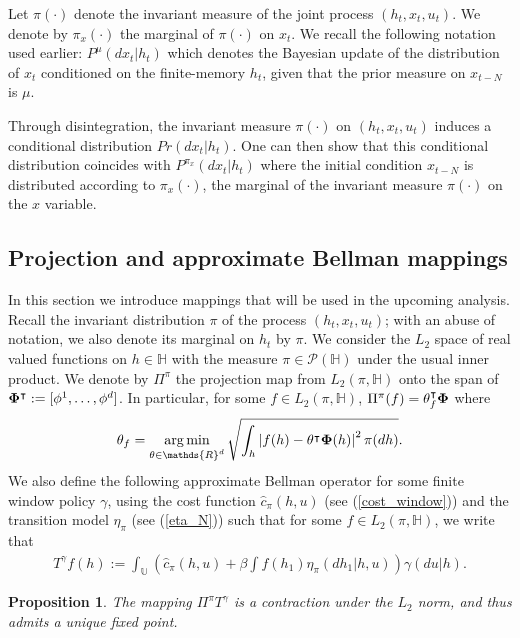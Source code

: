 \documentclass[letterpaper, 10 pt, conference]{ieeeconf}  %
\def\argmin{\mathop{\rm arg\, min}}
\def\P{{\mathcal P}}
\newtheorem{prop}{Proposition}
\theoremstyle{definition}
\theoremstyle{remark}
\begin{document}
Let $\pi(\cdot)$ denote the invariant measure of the joint process $(h_t,x_{t},u_t)$.  We denote by $\pi_x(\cdot)$ the marginal of $\pi(\cdot)$ on $x_t$. We recall the following notation used earlier:
$
P^\mu(dx_t|h_t)
$
which denotes the Bayesian update of the distribution of $x_t$ conditioned on the finite-memory $h_t$, given that the prior measure on  $x_{t-N}$ is $\mu$. 

Through disintegration, the invariant measure $\pi(\cdot)$ on $(h_t,x_{t},u_t)$ induces a conditional distribution $Pr(dx_t|h_t)$. 
One can then show that this conditional distribution coincides with $P^{\pi_x}(dx_t|h_t)$ where the initial condition $x_{t-N}$ is distributed according to $\pi_x(\cdot)$, the marginal of the invariant measure $\pi(\cdot)$ on the $x$ variable.

\subsection{Projection and approximate Bellman mappings} In this section we introduce mappings that will be used in the upcoming analysis. Recall the invariant distribution $\pi$ of the process $(h_t,x_t,u_t)$; with an abuse of notation, we also denote its marginal on $h_t$ by $\pi$. We consider the $L_2$ space of real valued functions on $h\in \mathds{H}$ with the measure $\pi\in \P(\mathds{H})$ under the usual inner product. We denote by $\Pi^\pi$ the projection map from $ L_2(\pi,\mathds{H})$ onto the span of ${\bf \Phi}^\intercal:= [\phi^1,\dots,\phi^d]$. In particular, for some $f\in  L_2(\pi,\mathds{H})$, $\Pi^\pi(f) = \theta_f^\intercal {\bf \Phi} $ where 
\begin{align}\label{proj}
\theta_f =\argmin_{\theta\in\mathds{R}^d} \sqrt{\int_h \left| f(h) - \theta^\intercal {\bf \Phi}(h)\right|^2 \pi(dh)}.
\end{align}
We also define the following approximate Bellman operator for some finite window policy $\gamma$, using the cost function $\hat{c}_\pi(h,u)$ (see (\ref{cost_window})) and the transition model $\eta_\pi$ (see (\ref{eta_N})) such that for some $f\in L_2(\pi,\mathds{H})$, we write that
\begin{align}\label{appr_bell}
T^\gamma f(h) := \int_\mathds{U}\left(\hat{c}_\pi(h,u) + \beta \int f(h_1)\eta_\pi(dh_1|h,u)\right)\gamma(du|h).
\end{align}
\begin{prop}\label{comp_contr}
The mapping $\Pi^\pi T^\gamma$ is a contraction under the $L_2$ norm, and thus admits a unique fixed point.
\end{prop}
\end{document}
